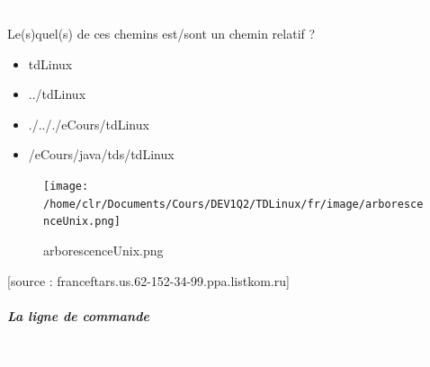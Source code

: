 \documentclass[11pt,a4paper]{article}
\begin{document}
			
		\subparagraph{} 
		
                \textcolor{white}{.} \par
            Le(s)quel(s) de ces chemins est/sont un chemin relatif ?
						
            \begin{itemize} 
        
            \item[ \ding{"6F} ] tdLinux
        
            \item[ \ding{"6F} ] ../tdLinux
        
            \item[ \ding{"6F} ] ./.././eCours/tdLinux
        
            \item[ \ding{"6F} ] /eCours/java/tds/tdLinux
        
            \end{itemize} 
        \begin{figure}[hbt]
				    \begin{center}
					\texttt{[image: /home/clr/Documents/Cours/DEV1Q2/TDLinux/fr/image/arborescenceUnix.png]}
						\end{center}
                
                    \caption[arborescenceUnix.png]{arborescenceUnix.png}
                \end{figure}
                    
			    
			    [source : franceftars.us.62-152-34-99.ppa.listkom.ru]
        
            \par
        
			
		\subparagraph{La ligne de commande} 
		
                \textcolor{white}{.} \par
            
\end{document}
